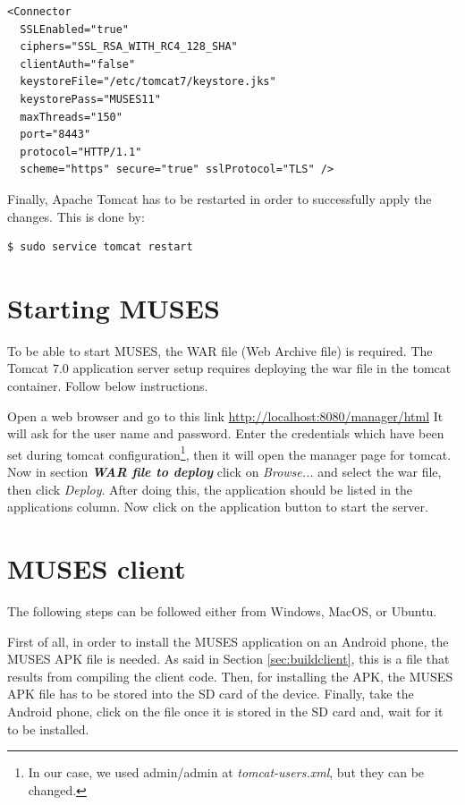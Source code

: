\begin{verbatim}
<Connector
  SSLEnabled="true"
  ciphers="SSL_RSA_WITH_RC4_128_SHA"
  clientAuth="false"
  keystoreFile="/etc/tomcat7/keystore.jks"
  keystorePass="MUSES11"
  maxThreads="150"
  port="8443"
  protocol="HTTP/1.1"
  scheme="https" secure="true" sslProtocol="TLS" />
\end{verbatim}

Finally, Apache Tomcat has to be restarted in order to successfully apply the changes. This is done by:

\begin{verbatim}
$ sudo service tomcat restart
\end{verbatim}

\section{Starting MUSES}
\label{sec:musestart}

To be able to start MUSES, the WAR file (Web Archive file) is required. %
The Tomcat 7.0 application server setup requires deploying the war file in the tomcat container. Follow below instructions. 

Open a web browser and go to this link
\url{http://localhost:8080/manager/html} 
It will ask for the user name and password. Enter the credentials which have been set during tomcat configuration\footnote{In our case, we used admin/admin at \textit{tomcat-users.xml}, but they can be changed.}, then it will open the manager page for tomcat. Now in section \textit{\textbf{WAR file to deploy}} click on \textit{Browse...} and select the war file, then click \textit{Deploy}. 
After doing this, the application should be listed in the applications column. Now click on the application button to start the server.

\section{MUSES client}
\label{sec:musesclient}

The following steps can be followed either from Windows, MacOS, or Ubuntu.

First of all, in order to install the MUSES application on an Android phone, the MUSES APK file is needed. As said in Section \ref{sec:buildclient}, this is a file that results from compiling the client code. Then, for installing the APK, the MUSES APK file has to be stored into the SD card of the device. Finally, take the Android phone, click on the file once it is stored in the SD card and, wait for it to be installed.

